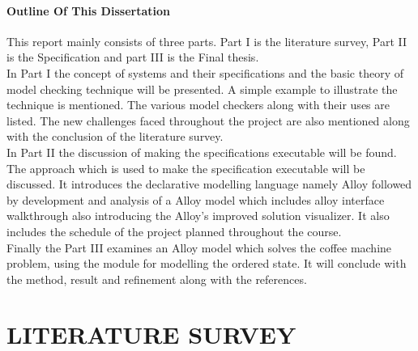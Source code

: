 \documentclass[a4paper,12pt]{extarticle}
\begin{document}
\subsection{Outline Of This Dissertation}
\label{Outline dissert}
This report mainly consists of three parts. Part I is the literature survey, Part II is the Specification and part III is the Final thesis.\\
In Part I the concept of systems and their specifications and the basic theory of model checking technique will be presented. A simple example to illustrate the technique is mentioned. The various model checkers along with their uses are listed. The new challenges faced throughout the project are also mentioned along with the conclusion of the literature survey.\\
In Part II the discussion of making the specifications executable will be found. The approach which is used to make the specification executable will be discussed. It introduces the declarative modelling language namely Alloy followed by development and analysis of a Alloy model which includes alloy interface walkthrough also introducing the Alloy's improved solution visualizer. It also includes the schedule of the project planned throughout the course.\\
Finally the Part III examines an Alloy model which solves the coffee machine problem, using the module for modelling the ordered state. It will conclude with the method, result and refinement along with the references. 
\pagebreak 
\part{LITERATURE SURVEY}
\pagebreak 
\end{document}
